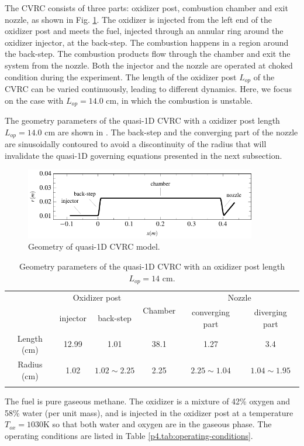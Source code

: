 The CVRC consists of three parts: oxidizer post, combustion chamber and exit nozzle, as shown in Fig. \ref{p4.fig:radius}. The oxidizer is injected from the left end of the oxidizer post and meets the fuel, injected through an annular ring around the oxidizer injector, at the back-step. The combustion happens in a region around the back-step. The combustion products flow through the chamber and exit the system from the nozzle.  Both the injector and the nozzle are operated at choked condition during the experiment. The length of the oxidizer post $L_{op}$ of the CVRC can be varied continuously, leading to different dynamics. Here, we focus on the case with $L_{op}= 14.0$ cm, in which the combustion is unstable.

The geometry parameters of the quasi-1D CVRC with a oxidizer post length  $L_{op}= 14.0$ cm are shown in .  The back-step and the converging part of the nozzle are sinusoidally contoured to avoid a discontinuity of the radius that will invalidate the quasi-1D governing equations presented in the next subsection.

\begin{figure}[h!]
\centering
	\includegraphics[width=0.9\textwidth]{./TikzFigures/thesis-figure24}
\caption{Geometry of quasi-1D CVRC model.}
\label{p4.fig:radius}
\end{figure}

\begin{table} [h]
	\centering
	\caption{Geometry parameters of the quasi-1D CVRC with an oxidizer post length $L_{op}=14$ cm.}
	\centering
	\begin{tabular}{c c c c c c }
		\toprule
		\centering
		\multirow{2}{*}{Section} &
		\multicolumn{2}{c}{Oxidizer post} &
		\multirow{2}{*}{Chamber} &
		\multicolumn{2}{c}{Nozzle} \\
		\cmidrule(lr){2-3} \cmidrule(lr){5-6}
		& injector & back-step & & converging part & diverging part\\
		\midrule
		Length (cm) & 12.99 & 1.01 & 38.1 & 1.27 & 3.4 \\
		Radius (cm) & 1.02  & $1.02 \sim 2.25$ & 2.25 & $2.25 \sim 1.04$ & $1.04 \sim 1.95$ \\
		\bottomrule
		\label{p4.tab:geometry_parameters}
	\end{tabular} 
\end{table}
The fuel is pure gaseous methane. The oxidizer is a mixture of 42\% oxygen and 58\% water (per unit mass), and is injected in the oxidizer post at a temperature $T_{ox}=1030\text{K}$ so that both water and oxygen are in the gaseous phase. The operating conditions are listed in Table \ref{p4.tab:operating-conditions}.

